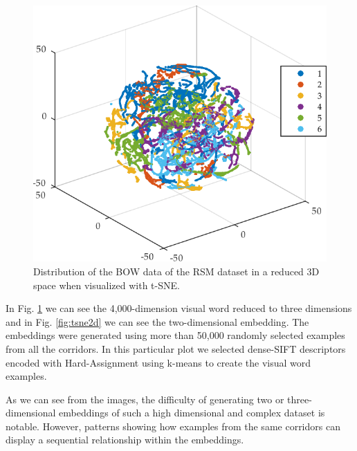 \begin{figure}
\centering
\includegraphics[width=\textwidth]{gfx/Chapter04/tsne_dsift_3d.pdf}
\caption{Distribution of the BOW data of the RSM dataset in a reduced 3D space when visualized with t-SNE.}
\label{fig:tsne3d}
\end{figure}

In Fig. \ref{fig:tsne3d} we can see the 4,000-dimension visual word reduced to three dimensions and in Fig. \ref{fig:tsne2d} we can see the two-dimensional embedding. The embeddings were generated using more than 50,000 randomly selected examples from all the corridors. In this particular plot we selected dense-SIFT descriptors encoded with Hard-Assignment using k-means to create the visual word examples.

As we can see from the images, the difficulty of generating two or three-dimensional embeddings of such a high dimensional and complex dataset is notable. However, patterns showing how examples from the same corridors can display a sequential relationship within the embeddings.


